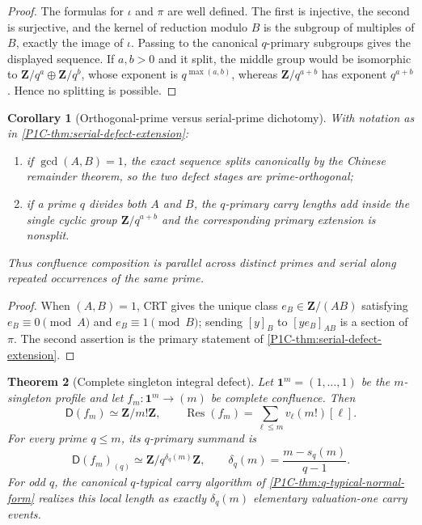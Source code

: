 \documentclass[11pt]{article}
\newtheorem{theorem}{Theorem}[section]
\newtheorem{corollary}[theorem]{Corollary}
\theoremstyle{remark}
\newcommand{\Z}{\mathbf Z}
\begin{document}
\begin{proof}
The formulas for $\iota$ and $\pi$ are well defined. The first is injective, the second is
surjective, and the kernel of reduction modulo $B$ is the subgroup of multiples of $B$, exactly the
image of $\iota$. Passing to the canonical $q$-primary subgroups gives the displayed sequence.
If $a,b>0$ and it split, the middle group would be isomorphic to
$\Z/q^a\oplus\Z/q^b$, whose exponent is $q^{\max(a,b)}$, whereas
$\Z/q^{a+b}$ has exponent $q^{a+b}$. Hence no splitting is possible.
\end{proof}

\begin{corollary}[Orthogonal-prime versus serial-prime dichotomy]
\label{P1C-cor:orthogonal-serial-dichotomy}
With notation as in \cref{P1C-thm:serial-defect-extension}:
\begin{enumerate}[label=\textup{(\roman*)}]
\item if $\gcd(A,B)=1$, the exact sequence splits canonically by the Chinese remainder theorem,
so the two defect stages are prime-orthogonal;
\item if a prime $q$ divides both $A$ and $B$, the $q$-primary carry lengths add inside the single
cyclic group $\Z/q^{a+b}$ and the corresponding primary extension is nonsplit.
\end{enumerate}
Thus confluence composition is parallel across distinct primes and serial along repeated occurrences
of the same prime.
\end{corollary}

\begin{proof}
When $(A,B)=1$, CRT gives the unique class $e_B\in\Z/(AB)$ satisfying
$e_B\equiv0\pmod A$ and $e_B\equiv1\pmod B$; sending $[y]_B$ to $[ye_B]_{AB}$ is a section
of $\pi$. The second assertion is the primary statement of
\cref{P1C-thm:serial-defect-extension}.
\end{proof}

\begin{theorem}[Complete singleton integral defect]\label{P1C-thm:singleton-integral-defect}
Let $\mathbf 1^m=(1,\ldots,1)$ be the $m$-singleton profile and let
$f_m:\mathbf1^m\to(m)$ be complete confluence. Then
\[
 \boxed{
 \mathsf D(f_m)\simeq\Z/m!\Z,
 \qquad
 \operatorname{Res}(f_m)
 =\sum_{\ell\le m}v_\ell(m!)[\ell].}
\]
For every prime $q\le m$, its $q$-primary summand is
\[
 \boxed{
 \mathsf D(f_m)_{(q)}\simeq\Z/q^{\delta_q(m)}\Z,
 \qquad
 \delta_q(m)=\frac{m-s_q(m)}{q-1}.}
\]
For odd $q$, the canonical $q$-typical carry algorithm of
\cref{P1C-thm:q-typical-normal-form} realizes this local length as exactly $\delta_q(m)$ elementary
valuation-one carry events.
\end{theorem}
\end{document}
